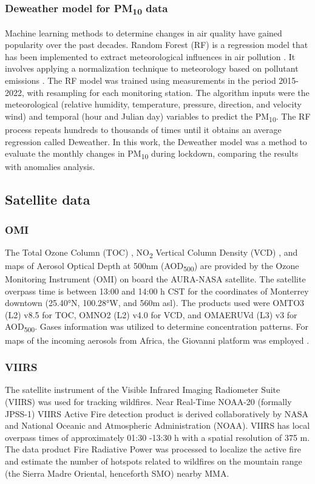 \documentclass[preprint,12pt]{elsarticle}
\begin{document}
\subsubsection*{Deweather model for PM\textsubscript{10} data}
Machine learning methods to determine changes in air quality have gained popularity over the past decades. Random Forest (RF) is a regression model that has been implemented to extract meteorological influences in air pollution \citep{Breiman_2001,Vu_2019,Cole_2020}. It involves applying a normalization technique to meteorology based on pollutant emissions  \citep{Stuart_2019,Zongbo_2021,Lv_2022}. The RF model was trained using measurements in the period 2015-2022, with resampling for each monitoring station. The algorithm inputs were the meteorological (relative humidity, temperature, pressure, direction, and velocity wind) and temporal (hour and Julian day) variables to predict the PM\textsubscript{10}. The RF process repeats hundreds to thousands of times until it obtains an average regression called Deweather. In this work, the Deweather model was a method to evaluate the monthly changes in PM\textsubscript{10} during lockdown, comparing the results with anomalies analysis.
\subsection*{Satellite data}
\subsubsection*{OMI}
The Total Ozone Column (TOC) \citep{dcio}, NO\textsubscript{2} Vertical Column Density (VCD) \citep{Lamsal_2020}, and maps of Aerosol Optical Depth at 500nm (AOD\textsubscript{500}) are provided by the Ozone Monitoring Instrument (OMI) on board the AURA-NASA satellite. The satellite overpass time is between 13:00 and 14:00 h CST for the coordinates of Monterrey downtown (25.40°N, 100.28°W, and 560m asl). The products used were OMTO3 (L2) v8.5 for TOC, OMNO2 (L2) v4.0 for VCD, and OMAERUVd (L3) v3 for AOD\textsubscript{500}. Gases information was utilized to determine concentration patterns. For maps of the incoming aerosols from Africa, the Giovanni platform was employed \citep{torres2008}.
\subsubsection*{VIIRS}
The satellite instrument of the Visible Infrared Imaging Radiometer Suite (VIIRS) \citep{Schroeder_2014} was used for tracking wildfires. Near Real-Time NOAA-20 (formally JPSS-1) VIIRS Active Fire detection product is derived collaboratively by NASA and National Oceanic and Atmospheric Administration (NOAA). VIIRS has local overpass times of approximately 01:30 -13:30 h with a spatial resolution of 375 m. The data product Fire Radiative Power \citep{earthdata} was processed to localize the active fire and estimate the number of hotspots related to wildfires on the mountain range (the Sierra Madre Oriental, henceforth SMO) nearby MMA.
\end{document}
